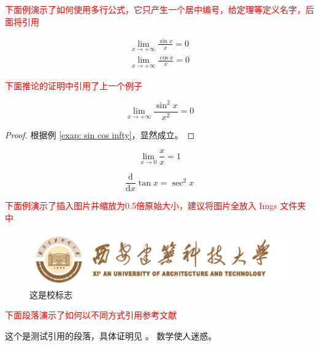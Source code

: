 \textcolor{red}{下面例演示了如何使用多行公式，它只产生一个居中编号，给定理等定义名字，后面将引用}
\begin{example}\label{exap: sin cos infty}
    \begin{equation}
        \begin{aligned}
            \lim_{x\to +\infty} \frac{\sin x}{x} = 0 \\
            \lim_{x\to +\infty} \frac{\cos x}{x} = 0
        \end{aligned}
    \end{equation}
\end{example}

\textcolor{red}{下面推论的证明中引用了上一个例子}
\begin{corollary}
    \[
        \lim_{x\to +\infty} \frac{\sin^2 x}{x^2} = 0
    \]
    \begin{proof}
        根据例 \ref{exap: sin cos infty}，显然成立。
    \end{proof}
\end{corollary}

\begin{remark}
    \[
        \lim_{x\to 0} \frac{x}{x} = 1
    \]
\end{remark}

\begin{equation}
    \frac{\mathrm{d}}{\mathrm{d}x} \tan x = \sec^2 x
\end{equation}

\textcolor{red}{下面例演示了插入图片并缩放为0.5倍原始大小，建议将图片全放入 Imgs 文件夹中}

\begin{figure}[h]
    \centering %
    \includegraphics[scale=0.5]{Imgs/xiaoming.png}
    \caption{这是校标志}
\end{figure}

\textcolor{red}{下面段落演示了如何以不同方式引用参考文献}

这个是测试引用的段落\cite{Ibrahim2022}，具体证明见 \cite[定理 8]{SB2077}。
数学使人迷惑\supercite{SB2077}。


